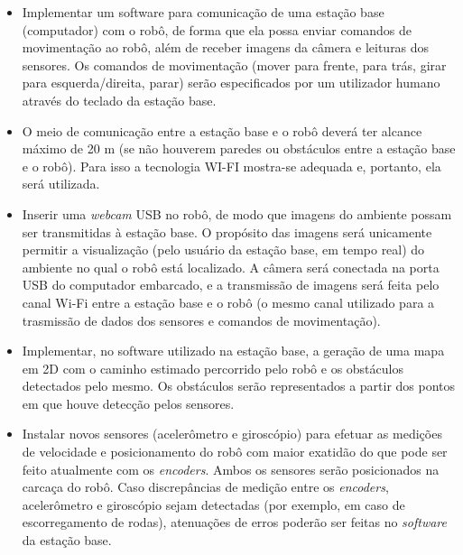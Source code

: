 \begin{itemize}
  \item Implementar um software para comunicação de uma estação base (computador) com o robô, de forma que ela possa enviar comandos de movimentação ao robô, além de receber imagens da câmera e leituras dos sensores. Os comandos de movimentação (mover para frente, para trás, girar para esquerda/direita, parar) serão especificados por um utilizador humano através do teclado da estação base. 
  \item O meio de comunicação entre a estação base e o robô deverá ter alcance máximo de 20 m (se não houverem paredes ou obstáculos entre a estação base e o robô). Para isso a tecnologia WI-FI mostra-se adequada e, portanto, ela será utilizada.
  \item Inserir uma \textit{webcam} USB no robô, de modo que imagens do ambiente possam ser transmitidas à estação base. O propósito das imagens será unicamente permitir a visualização (pelo usuário da estação base, em tempo real) do ambiente no qual o robô está localizado. A câmera será conectada na porta USB do computador embarcado, e a transmissão de imagens será feita pelo canal Wi-Fi entre a estação base e o robô (o mesmo canal utilizado para a trasmissão de dados dos sensores e comandos de movimentação).
  \item Implementar, no software utilizado na estação base, a geração de uma mapa em 2D com o caminho estimado percorrido pelo robô e os obstáculos detectados pelo mesmo. Os obstáculos serão representados a partir dos pontos em que houve detecção pelos sensores.
  \item Instalar novos sensores (acelerômetro e giroscópio) para efetuar as medições de velocidade e posicionamento do robô com maior exatidão do que pode ser feito atualmente com os \textit{encoders}. Ambos os sensores serão posicionados na carcaça do robô. Caso discrepâncias de medição entre os \textit{encoders}, acelerômetro e giroscópio sejam detectadas (por exemplo, em caso de escorregamento de rodas), atenuações de erros poderão ser feitas no \textit{software} da estação base.

\end{itemize}
